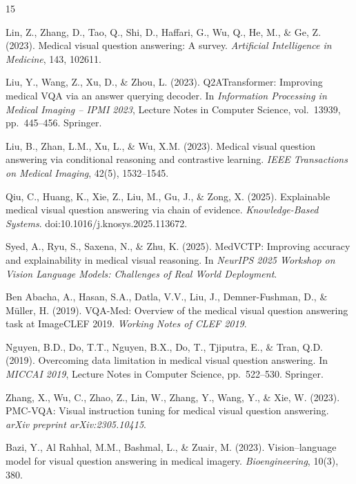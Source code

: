 \documentclass{article}
\begin{document}
\begin{thebibliography}{15}
\small

Lin, Z., Zhang, D., Tao, Q., Shi, D., Haffari, G., Wu, Q., He, M., \& Ge, Z. (2023). Medical visual question
answering: A survey. \emph{Artificial Intelligence in Medicine}, 143, 102611.

Liu, Y., Wang, Z., Xu, D., \& Zhou, L. (2023). Q2ATransformer: Improving medical VQA via an answer querying decoder.
In \emph{Information Processing in Medical Imaging -- IPMI 2023}, Lecture Notes in Computer Science, vol.~13939,
pp.~445--456. Springer.

Liu, B., Zhan, L.M., Xu, L., \& Wu, X.M. (2023). Medical visual question answering via conditional reasoning and
contrastive learning. \emph{IEEE Transactions on Medical Imaging}, 42(5), 1532--1545.

Qiu, C., Huang, K., Xie, Z., Liu, M., Gu, J., \& Zong, X. (2025). Explainable medical visual question answering via
chain of evidence. \emph{Knowledge-Based Systems}. doi:10.1016/j.knosys.2025.113672.

Syed, A., Ryu, S., Saxena, N., \& Zhu, K. (2025). MedVCTP: Improving accuracy and explainability in medical visual reasoning. In
\emph{NeurIPS 2025 Workshop on Vision Language Models: Challenges of Real World Deployment}.

Ben Abacha, A., Hasan, S.A., Datla, V.V., Liu, J., Demner-Fushman, D., \& M\"uller, H. (2019). VQA-Med: Overview of
the medical visual question answering task at ImageCLEF 2019. \emph{Working Notes of CLEF 2019}.

Nguyen, B.D., Do, T.T., Nguyen, B.X., Do, T., Tjiputra, E., \& Tran, Q.D. (2019). Overcoming data limitation in
medical visual question answering. In \emph{MICCAI 2019}, Lecture Notes in Computer Science, pp.~522--530. Springer.

Zhang, X., Wu, C., Zhao, Z., Lin, W., Zhang, Y., Wang, Y., \& Xie, W. (2023). PMC-VQA: Visual instruction tuning for
medical visual question answering. \emph{arXiv preprint arXiv:2305.10415}.

Bazi, Y., Al Rahhal, M.M., Bashmal, L., \& Zuair, M. (2023). Vision--language model for visual question answering in
medical imagery. \emph{Bioengineering}, 10(3), 380.


\end{thebibliography}
\end{document}
